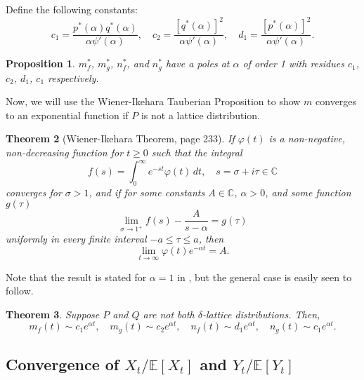\documentclass[12pt]{amsart}
\theoremstyle{plain}
\newtheorem{thm}{Theorem}[section]
\newtheorem{prop}[thm]{Proposition}
\theoremstyle{definition}
\theoremstyle{remark}
\theoremstyle{definition}
\begin{document}
Define the following constants:
\begin{equation}
c_1 = \frac{p^*(\alpha)q^*(\alpha)}{\alpha \psi'(\alpha)} ,\quad
c_2 = \frac{[q^*(\alpha)]^2}{\alpha \psi'(\alpha)} ,\quad
d_1 = \frac{[p^*(\alpha)]^2}{\alpha \psi'(\alpha)} .
\end{equation}

\begin{prop}\label{mstarPole}
$m_f^*$, $m_g^*$, $n_f^*$, and $n_g^*$ have a poles at $\alpha$ of order 1 with residues $c_1$, $c_2$, $d_1$, $c_1$ respectively.
\end{prop}

Now, we will use the Wiener-Ikehara Tauberian Proposition to show $m$ converges to an exponential function if $P$ is not a lattice distribution.

\begin{thm}[Wiener-Ikehara Theorem, \cite{widder} page 233] \label{ikehara}
If $\varphi(t)$ is a non-negative, non-decreasing function for $t \geq 0$ such that the integral
\begin{equation}
f(s) = \int_0^\infty e^{-st} \varphi(t) \, dt, \quad s=\sigma+i\tau \in \mathbb{C}
\end{equation}
converges for $\sigma > 1$, and if for some constants $A\in \mathbb C$, $\alpha>0$, and some function $g(\tau)$
\begin{equation}
\lim_{\sigma \to 1^+} f(s) - \frac{A}{s-\alpha} = g(\tau)
\end{equation}
uniformly in every finite interval $-a \leq \tau \leq a$, then
\begin{equation}
\lim_{t \to \infty} \varphi(t) e^{-\alpha t} = A.
\end{equation}
\end{thm}

Note that the result is stated for $\alpha=1$ in \cite{widder}, but the general case is easily seen to follow.

\begin{thm} \label{expected-value-converges}
Suppose $P$ and $Q$ are not both $\delta$-lattice distributions.
Then,
\begin{equation}
m_f(t) \sim c_1 e^{\alpha t}, \quad
m_g(t) \sim c_2 e^{\alpha t}, \quad
n_f(t) \sim d_1 e^{\alpha t}, \quad
n_g(t) \sim c_1 e^{\alpha t}.
\end{equation}
\end{thm}

\subsection{Convergence of $X_t/\mathbb{E}[X_t]$ and $Y_t/\mathbb{E}[Y_t]$}
\end{document}
